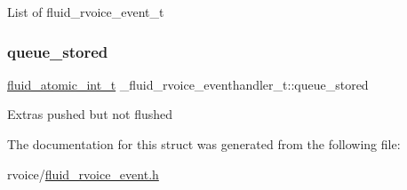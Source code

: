 List of fluid\+\_\+rvoice\+\_\+event\+\_\+t \mbox{\label{struct__fluid__rvoice__eventhandler__t_a65dbd6065de0b535ad69696923aaf6ae}} 
\subsubsection{\texorpdfstring{queue\+\_\+stored}{queue\_stored}}
{\footnotesize\ttfamily \hyperlink{fluidsynth__priv_8h_a6b8be882dd9958ea3635a868e1bf5152}{fluid\+\_\+atomic\+\_\+int\+\_\+t} \+\_\+fluid\+\_\+rvoice\+\_\+eventhandler\+\_\+t\+::queue\+\_\+stored}

Extras pushed but not flushed 

The documentation for this struct was generated from the following file\+:\begin{DoxyCompactItemize}
\item 
rvoice/\hyperlink{fluid__rvoice__event_8h}{fluid\+\_\+rvoice\+\_\+event.\+h}\end{DoxyCompactItemize}
